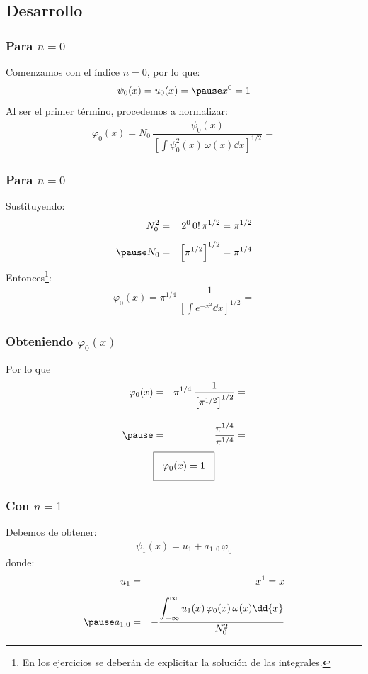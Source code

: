 \subsection{Desarrollo}
\begin{frame}
\frametitle{Para $n = 0$}
Comenzamos con el índice $n = 0$, por lo que:
\begin{eqnarray*}
\psi_{0}(x) = u_{0} (x) = \pause x^{0} =  1
\end{eqnarray*}
\pause
Al ser el primer término, procedemos a normalizar:
\begin{align*}
\varphi_{0} (x) = N_{0} \, \dfrac{\psi_{0}(x)}{\left[ \displaystyle \int \psi_{0}^{2} (x) \, \omega (x) \dd{x} \right]^{1/2}} =
\end{align*}
\end{frame}
\begin{frame}
\frametitle{Para $n = 0$}
Sustituyendo:
\begin{eqnarray*}
N_{0}^{2} &=& 2^{0} \, 0! \, \pi^{1/2} = \pi^{1/2} \\[0.5em] \pause
N_{0} &=& \left[ \pi^{1/2} \right]^{1/2} = \pi^{1/4}
\end{eqnarray*}
\pause
Entonces\footnote<3->{En los ejercicios se deberán de explicitar la solución de las integrales.}:
\begin{align*}
\varphi_{0} (x) = \pi^{1/4} \, \dfrac{1}{\left[ \displaystyle \int e^{-x^{2}} \dd{x} \right]^{1/2}} =
\end{align*}
\end{frame}
\begin{frame}
\frametitle{Obteniendo $\varphi_{0} (x)$}
Por lo que
\begin{eqnarray*}
\varphi_{0} (x) &=& \pi^{1/4} \, \dfrac{1}{\left[ \pi^{1/2} \right]^{1/2}} = \\[1em] \pause
&=& \dfrac{\pi^{1/4}}{\pi^{1/4}} =
\end{eqnarray*}
\pause
\begin{align*}
\setlength{\fboxsep}{3\fboxsep}\boxed{
\varphi_{0} (x) = 1}
\end{align*}
\end{frame}
\begin{frame}
\frametitle{Con $n = 1$}
Debemos de obtener:
\begin{align*}
\psi_{1} (x) = u_{1} + a_{1,0} \, \varphi_{0}
\end{align*}
\pause
donde:
\begin{eqnarray*}
u_{1} &=& x^{1} = x \\[0.5em] \pause
a_{1,0} &=& - \dfrac{\displaystyle \int_{-\infty}^{\infty} u_{1}(x) \, \varphi_{0} (x) \, \omega (x) \dd{x}}{N_{0}^{2}}
\end{eqnarray*}
\end{frame}
